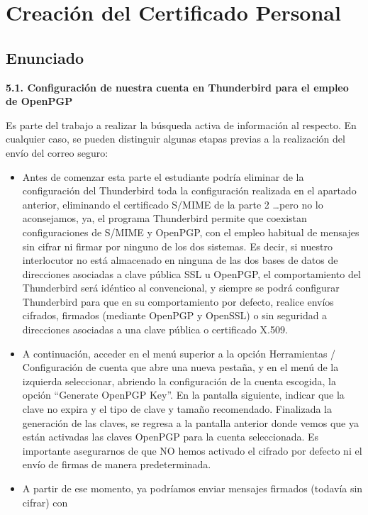\chapter{Creación del Certificado Personal}

\section{Enunciado}

\textbf{5.1. Configuración de nuestra cuenta en Thunderbird para el empleo de OpenPGP}

Es parte del trabajo a realizar la búsqueda activa de información al respecto. En cualquier caso, se
pueden distinguir algunas etapas previas a la realización del envío del correo seguro:

\begin{itemize}[label=\textbullet]
    \item Antes de comenzar esta parte el estudiante podría eliminar de la configuración del
    Thunderbird toda la configuración realizada en el apartado anterior, eliminando el certificado
    S/MIME de la parte 2 \dots pero no lo aconsejamos, ya, el programa Thunderbird permite
    que coexistan configuraciones de S/MIME y OpenPGP, con el empleo habitual de
    mensajes sin cifrar ni firmar por ninguno de los dos sistemas. Es decir, si nuestro interlocutor
    no está almacenado en ninguna de las dos bases de datos de direcciones asociadas a clave
    pública SSL u OpenPGP, el comportamiento del Thunderbird será idéntico al convencional,
    y siempre se podrá configurar Thunderbird para que en su comportamiento por defecto, realice
    envíos cifrados, firmados (mediante OpenPGP y OpenSSL) o sin seguridad a direcciones
    asociadas a una clave pública o certificado X.509.
    \item A continuación, acceder en el menú superior a la opción Herramientas / Configuración de
    cuenta que abre una nueva pestaña, y en el menú de la izquierda seleccionar, abriendo la
    configuración de la cuenta escogida, la opción ``Generate OpenPGP Key''. En la pantalla
    siguiente, indicar que la clave no expira y el tipo de clave y tamaño recomendado. Finalizada
    la generación de las claves, se regresa a la pantalla anterior donde vemos que ya están
    activadas las claves OpenPGP para la cuenta seleccionada. Es importante asegurarnos de
    que NO hemos activado el cifrado por defecto ni el envío de firmas de manera
    predeterminada.
    \item A partir de ese momento, ya podríamos enviar mensajes firmados (todavía sin cifrar) con

\end{itemize}
